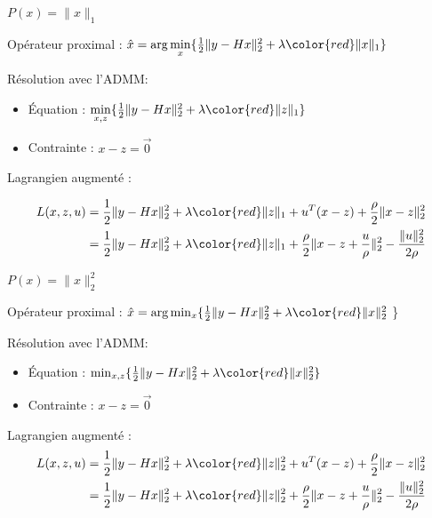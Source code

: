 \begin{frame}{$P(x) = \lVert x \rVert_{1}$}

Opérateur proximal : $\hat{x} = \arg\min\limits_{x} \{ 
    \frac{1}{2} \lVert y - Hx \rVert_{2}^{2} 
    + \lambda {\color{red} \lVert x \rVert_{1} } 
\}$ \\

\vspace{5mm}

Résolution avec l'ADMM:
\begin{itemize}
    \item Équation : $\min\limits_{x, z} \{ 
        \frac{1}{2} \lVert y - Hx \rVert_{2}^{2} 
        + \lambda {\color{red} \lVert z \rVert_{1} } 
    \}$
    \item Contrainte : $x-z = \overrightarrow{0}$
\end{itemize}

\vspace{5mm}

Lagrangien augmenté :

\begin{align*}
L(x, z, u) 
&= \frac{1}{2} \lVert y - Hx \rVert_{2}^{2} + \lambda {\color{red} \lVert z \rVert_{1} }  +
u^{T}(x-z) + \frac{\rho}{2} \lVert x-z \rVert_{2}^{2} \\
&= \frac{1}{2} \lVert y - Hx \rVert_{2}^{2} + \lambda {\color{red} \lVert z \rVert_{1} }  +
\frac{\rho}{2} \lVert x-z+\frac{u}{\rho} \rVert_{2}^{2} - \frac{\lVert u \rVert_{2}^{2}}{2\rho}    
\end{align*}

\end{frame}

\begin{frame}{$P(x) = \lVert x \rVert_{2}^{2}$}

Opérateur proximal : $\hat{x} = \arg \min_{x} \{ 
    \frac{1}{2} \lVert y - Hx \rVert_{2}^{2} 
    + \lambda {\color{red} \lVert x \rVert_{2}^{2}}$ 
\} \\

\vspace{5mm}

Résolution avec l'ADMM:
\begin{itemize}
    \item Équation : $\min_{x, z} \{ 
        \frac{1}{2} \lVert y - Hx \rVert_{2}^{2} 
        + \lambda {\color{red} \lVert x \rVert_{2}^{2}} \}$
    \item Contrainte : $x-z = \overrightarrow{0}$
\end{itemize}

\vspace{5mm}

Lagrangien augmenté :
\begin{align*}
L(x, z, u)
&= \frac{1}{2} \lVert y - Hx \rVert_{2}^{2} 
+ \lambda {\color{red} \lVert z \rVert_{2}^{2}} +
u^{T}(x-z) + \frac{\rho}{2} \lVert x-z \rVert_{2}^{2} \\
&= \frac{1}{2} \lVert y - Hx \rVert_{2}^{2} 
+ \lambda {\color{red} \lVert z \rVert_{2}^{2}} +
\frac{\rho}{2} \lVert x-z+\frac{u}{\rho} \rVert_{2}^{2} - \frac{\lVert u \rVert_{2}^{2}}{2\rho}
\end{align*}

\end{frame}

